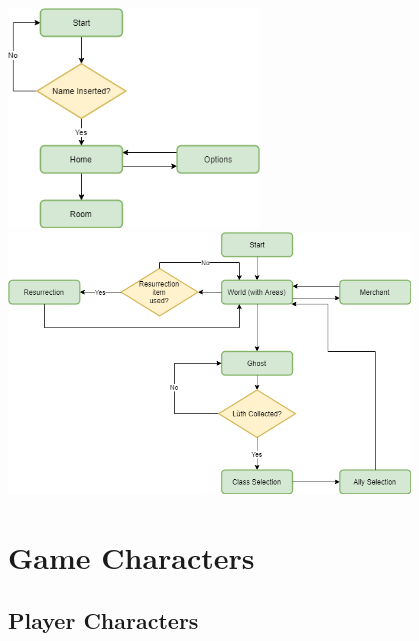 \documentclass[12pt]{article}
\begin{document}
\begin{center}
	\includegraphics[width=0.5\textwidth]{Diagramma1}
	\newline\newline\newline
	\includegraphics[width=0.8\textwidth]{Diagramma2}
\end{center}

\newpage

\section{Game Characters}

\subsection{Player Characters}
\end{document}
